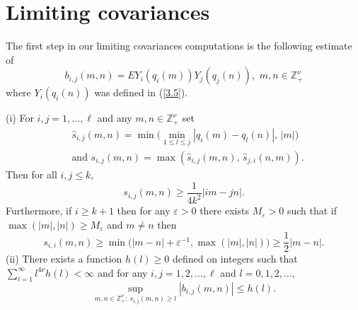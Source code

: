   
  \section{Limiting covariances}\label{sec4}\setcounter{equation}{0}

The first step in our limiting covariances computations is the following 
estimate of
\begin{equation*}
b_{i,j}(m,n)=EY_i(q_i(m))Y_j(q_j(n)),\,\, m,n\in{{\mathbb Z}}^\nu_+
\end{equation*}
where $Y_i(q_i(n))$ was defined in (\ref{3.5}).

\begin{lemma}\label{lem4.1} (i) For $i,j=1,...,\ell$ and any $m,n\in{{\mathbb Z}}^\nu_+$
set 
\begin{eqnarray}\label{4.1}
&\hat s_{i,j}(m,n)=\min\big(\min_{1\leq l\leq j}|q_i(m)-q_l(n)|,\,|m|\big)\\
&\mbox{and}\,\, s_{i,j}(m,n)=\max(\hat s_{i,j}(m,n),\,\hat s_{j,i}(n,m)).
\nonumber\end{eqnarray}
Then for all $i,j\leq k$,
\begin{equation}\label{4.2}
s_{i,j}(m,n)\geq\frac 1{4k^2}|im-jn|.
\end{equation}
Furthermore, if $i\geq k+1$ then for any ${{\varepsilon}}>0$ there exists $M_{{\varepsilon}}>0$ 
such that if $\max(|m|,|n|)\geq M_{{\varepsilon}}$ and $m\ne n$ then 
\begin{equation}\label{4.3}
s_{i,i}(m,n)\geq \min\big(|m-n|+{{\varepsilon}}^{-1},\max(|m|,|n|)\big)\geq\frac 12|m-n|.
\end{equation}
(ii) There exists a function $h(l)\geq 0$ defined on integers such that 
$\sum_{l=1}^\infty l^{4\nu} h(l)<\infty$ and for any $i,j=1,2,...,\ell$ and
$l=0,1,2,...$,
\begin{equation}\label{4.4}
\sup_{m,n\in{{\mathbb Z}}^\nu_+:\, s_{i,j}(m,n)\geq l}|b_{i,j}(m,n)|\leq h(l).
\end{equation}
\end{lemma}
